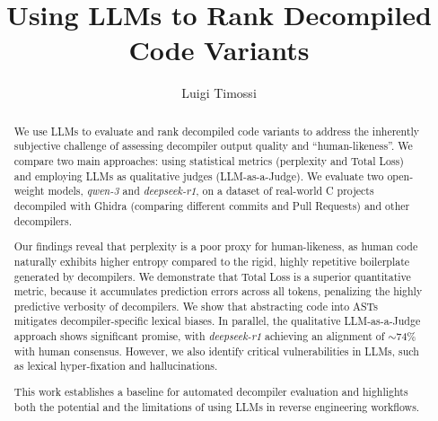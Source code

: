 \documentclass{meta/masterthesis}
\begin{document}
\title{Using LLMs to Rank Decompiled Code Variants}

\author{Luigi Timossi}




\maketitle

\begin{abstract}
We use \acp{LLM} to evaluate and rank decompiled code variants to address the inherently subjective challenge of assessing decompiler output quality and ``human-likeness''. We compare two main approaches: using statistical metrics (perplexity and Total Loss) and employing \acp{LLM} as qualitative judges (LLM-as-a-Judge). We evaluate two open-weight models, \emph{qwen-3} and \emph{deepseek-r1}, on a dataset of real-world C projects decompiled with Ghidra (comparing different commits and Pull Requests) and other decompilers.

Our findings reveal that perplexity is a poor proxy for human-likeness, as human code naturally exhibits higher entropy compared to the rigid, highly repetitive boilerplate generated by decompilers. We demonstrate that Total Loss is a superior quantitative metric, because it accumulates prediction errors across all tokens, penalizing the highly predictive verbosity of decompilers. We show that abstracting code into \acp{AST} mitigates decompiler-specific lexical biases. In parallel, the qualitative LLM-as-a-Judge approach shows significant promise, with \emph{deepseek-r1} achieving an alignment of $\sim$74\% with human consensus. However, we also identify critical vulnerabilities in \acp{LLM}, such as lexical hyper-fixation and hallucinations. 

This work establishes a baseline for automated decompiler evaluation and highlights both the potential and the limitations of using \acp{LLM} in reverse engineering workflows.
\end{abstract}

\tableofcontents













\printbibliography
% 
% 


\end{document}
